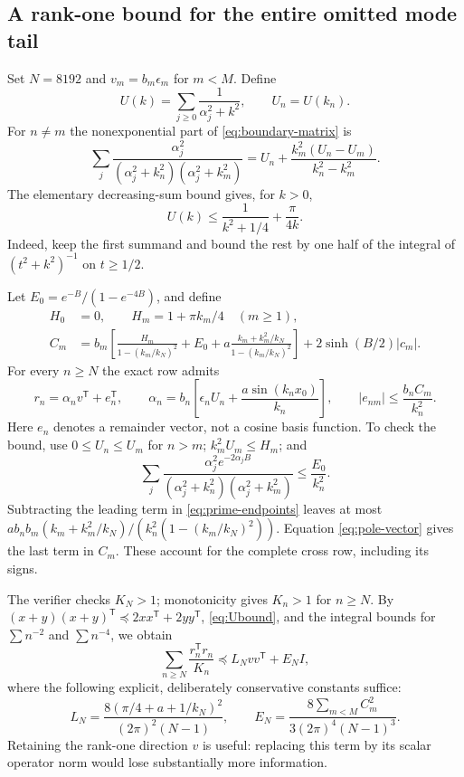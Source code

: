 \documentclass[11pt]{article}
\begin{document}
\subsection{A rank-one bound for the entire omitted mode tail}
Set $N=8192$ and $v_m=b_m\epsilon_m$ for $m<M$. Define
\[
 U(k)=\sum_{j\ge0}\frac1{\alpha_j^2+k^2},\qquad U_n=U(k_n).
\]
For $n\ne m$ the nonexponential part of \eqref{eq:boundary-matrix} is
\[
 \sum_j\frac{\alpha_j^2}{(\alpha_j^2+k_n^2)(\alpha_j^2+k_m^2)}
 =U_n+\frac{k_m^2(U_n-U_m)}{k_n^2-k_m^2}.
\]
The elementary decreasing-sum bound gives, for $k>0$,
\begin{equation}\label{eq:Ubound}
 U(k)\le\frac1{k^2+1/4}+\frac\pi{4k}.
\end{equation}
Indeed, keep the first summand and bound the rest by one half of the
integral of $(t^2+k^2)^{-1}$ on $t\ge1/2$.

Let $E_0=e^{-B}/(1-e^{-4B})$, and define
\begin{align*}
 H_0&=0,\qquad H_m=1+\pi k_m/4\quad(m\ge1),\\
 C_m&=b_m\left[
 \frac{H_m}{1-(k_m/k_N)^2}+E_0+
 a\frac{k_m+k_m^2/k_N}{1-(k_m/k_N)^2}\right]
       +2\sinh(B/2)|c_m|.
\end{align*}
For every $n\ge N$ the exact row admits
\begin{equation}\label{eq:tail-row}
 r_n=\alpha_n v^{\mathsf T}+e_n^{\mathsf T},\qquad
 \alpha_n=b_n\left[\epsilon_nU_n+
                          \frac{a\sin(k_nx_0)}{k_n}\right],
 \qquad |e_{nm}|\le\frac{b_n C_m}{k_n^2}.
\end{equation}
Here $e_n$ denotes a remainder vector, not a cosine basis function.
To check the bound, use $0\le U_n\le U_m$ for $n>m$;
$k_m^2U_m\le H_m$; and
\[
 \sum_j\frac{\alpha_j^2e^{-2\alpha_jB}}
 { (\alpha_j^2+k_n^2)(\alpha_j^2+k_m^2)}\le\frac{E_0}{k_n^2}.
\]
Subtracting the leading term in \eqref{eq:prime-endpoints} leaves at most
$a b_nb_m(k_m+k_m^2/k_N)/(k_n^2(1-(k_m/k_N)^2))$.
Equation \eqref{eq:pole-vector} gives the last term in $C_m$.
These account for the complete cross row, including its signs.

The verifier checks $K_N>1$; monotonicity gives $K_n>1$ for $n\ge N$.
By $(x+y)(x+y)^{\mathsf T}\preceq2xx^{\mathsf T}+2yy^{\mathsf T}$,
\eqref{eq:Ubound}, and the integral bounds for $\sum n^{-2}$ and
$\sum n^{-4}$, we obtain
\begin{equation}\label{eq:tail-bound}
 \sum_{n\ge N}\frac{r_n^{\mathsf T}r_n}{K_n}
 \preceq L_N vv^{\mathsf T}+E_N I,
\end{equation}
where the following explicit, deliberately conservative constants suffice:
\begin{equation}\label{eq:tail-constants}
 L_N=\frac{8(\pi/4+a+1/k_N)^2}{(2\pi)^2(N-1)},\qquad
 E_N=\frac{8\sum_{m<M}C_m^2}{3(2\pi)^4(N-1)^3}.
\end{equation}
Retaining the rank-one direction $v$ is useful: replacing this term by
its scalar operator norm would lose substantially more information.
\end{document}
